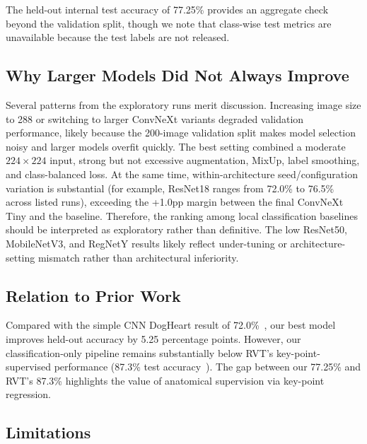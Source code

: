 \documentclass[10pt,twocolumn,letterpaper]{article}
\newcommand{\BestTestAccuracy}{77.25\%}
\begin{document}
The held-out internal test accuracy of \BestTestAccuracy{} provides an aggregate check beyond the validation split, though we note that class-wise test metrics are unavailable because the test labels are not released.

\subsection{Why Larger Models Did Not Always Improve}

Several patterns from the exploratory runs merit discussion. Increasing image size to 288 or switching to larger ConvNeXt variants degraded validation performance, likely because the 200-image validation split makes model selection noisy and larger models overfit quickly. The best setting combined a moderate $224\times224$ input, strong but not excessive augmentation, MixUp, label smoothing, and class-balanced loss. At the same time, within-architecture seed/configuration variation is substantial (for example, ResNet18 ranges from 72.0\% to 76.5\% across listed runs), exceeding the +1.0pp margin between the final ConvNeXt Tiny and the baseline. Therefore, the ranking among local classification baselines should be interpreted as exploratory rather than definitive. The low ResNet50, MobileNetV3, and RegNetY results likely reflect under-tuning or architecture-setting mismatch rather than architectural inferiority.

\subsection{Relation to Prior Work}

Compared with the simple CNN DogHeart result of 72.0\%~\cite{deekonda2024simplecnn}, our best model improves held-out accuracy by 5.25 percentage points. However, our classification-only pipeline remains substantially below RVT's key-point-supervised performance (87.3\% test accuracy~\cite{li2024regressive}). The gap between our \BestTestAccuracy{} and RVT's 87.3\% highlights the value of anatomical supervision via key-point regression.

\subsection{Limitations}
\end{document}
